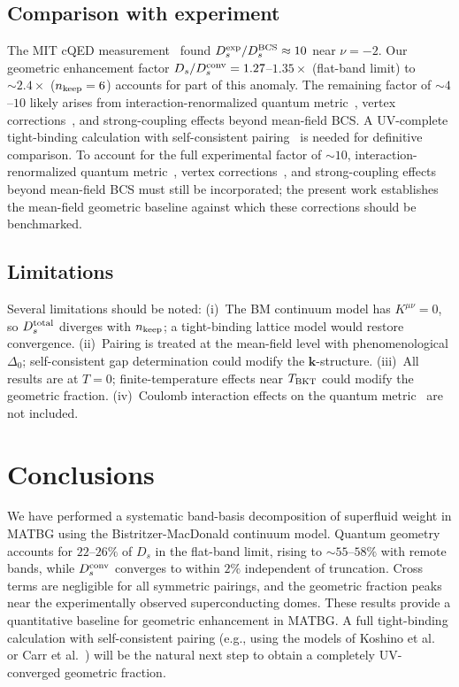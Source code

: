 \documentclass[prb,twocolumn,superscriptaddress,floatfix]{revtex4-2}
\begin{document}
\subsection{Comparison with experiment}

The MIT cQED measurement~\cite{tian_2023} found $D_s^{\rm exp} / D_s^{\rm BCS} \approx 10$ near $\nu = -2$.
Our geometric enhancement factor $D_s / D_s^{\rm conv} = 1.27$--$1.35\times$ (flat-band limit) to ${\sim}2.4\times$ ($n_{\rm keep} = 6$) accounts for part of this anomaly.
The remaining factor of ${\sim}4$--$10$ likely arises from interaction-renormalized quantum metric~\cite{herzog_2022}, vertex corrections~\cite{verma_2021}, and strong-coupling effects beyond mean-field BCS.
A UV-complete tight-binding calculation with self-consistent pairing~\cite{koshino_2018,carr_2019} is needed for definitive comparison. To account for the full experimental factor of $\sim 10$, interaction-renormalized quantum metric~\cite{herzog_2022}, vertex corrections~\cite{verma_2021}, and strong-coupling effects beyond mean-field BCS must still be incorporated; the present work establishes the mean-field geometric baseline against which these corrections should be benchmarked.

\subsection{Limitations}

Several limitations should be noted:
(i)~The BM continuum model has $K^{\mu\nu} = 0$, so $D_s^{\rm total}$ diverges with $n_{\rm keep}$; a tight-binding lattice model would restore convergence.
(ii)~Pairing is treated at the mean-field level with phenomenological $\Delta_0$; self-consistent gap determination could modify the $\mathbf{k}$-structure.
(iii)~All results are at $T = 0$; finite-temperature effects near $T_{\rm BKT}$ could modify the geometric fraction.
(iv)~Coulomb interaction effects on the quantum metric~\cite{torma_review_2022,herzog_2022} are not included.

\section{Conclusions}

We have performed a systematic band-basis decomposition of superfluid weight in MATBG using the Bistritzer-MacDonald continuum model.
Quantum geometry accounts for $22$--$26\%$ of $D_s$ in the flat-band limit, rising to ${\sim}55$--$58\%$ with remote bands, while $D_s^{\rm conv}$ converges to within $2\%$ independent of truncation.
Cross terms are negligible for all symmetric pairings, and the geometric fraction peaks near the experimentally observed superconducting domes.
These results provide a quantitative baseline for geometric enhancement in MATBG. A full tight-binding calculation with self-consistent pairing (e.g., using the models of Koshino et al.~\cite{koshino_2018} or Carr et al.~\cite{carr_2019}) will be the natural next step to obtain a completely UV-converged geometric fraction.
\end{document}
